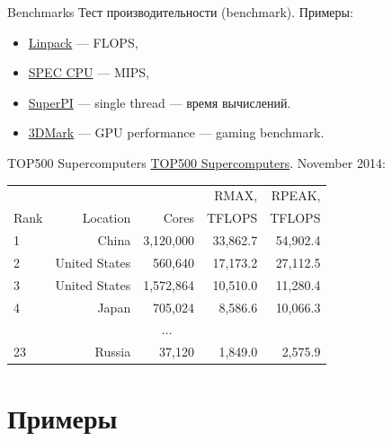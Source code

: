 \begin{frame}{Benchmarks}
Тест производительности (\abbr benchmark).
\vfill
Примеры:
\begin{itemize}
    \item \href{http://www.netlib.org/utk/people/JackDongarra/faq-linpack.html}{Linpack} --- FLOPS,
    \item \href{http://www.spec.org/benchmarks.html}{SPEC CPU} --- MIPS,
    \item \href{http://www.superpi.net}{SuperPI} --- single thread --- время вычислений.
    \item \href{http://www.3dmark.com/}{3DMark} --- GPU performance --- gaming benchmark.
\end{itemize}
\end{frame}

\begin{frame}{TOP500 Supercomputers}
\href{http://top500.org/}{TOP500 Supercomputers}.
\vfill
November 2014:
\begin{table}[htpb]
    \begin{center}
    \begin{tabular}{|l|r|r|r|r|}
    \hline
            &                   &               &   RMAX,       &   RPEAK,      \\
    Rank    &   Location        &   Cores       &   TFLOPS      &   TFLOPS      \\
    \hline
    1       &   China           &   3,120,000   &   33,862.7    &   54,902.4    \\
    \hline
    2       &   United States   &   560,640     &   17,173.2    &   27,112.5    \\
    \hline
    3       &   United States   &   1,572,864   &   10,510.0    &   11,280.4    \\
    \hline
    4       &   Japan           &   705,024     &   8,586.6     &   10,066.3    \\
    \hline
    \multicolumn{5}{c}{...}                                                     \\
    \hline
    23      &   Russia          &   37,120      &   1,849.0     &   2,575.9     \\
    \hline
    \end{tabular}
    \end{center}
\end{table}
\end{frame}

\section{Примеры}

